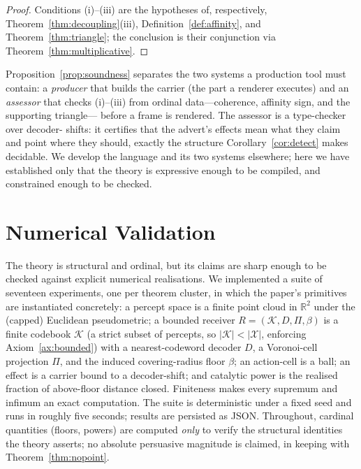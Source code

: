 \documentclass[twocolumn,11pt,a4paper]{article}
\theoremstyle{adv}
\theoremstyle{definition}
\theoremstyle{remark}
\newcommand{\Real}{\mathbb{R}}
\newcommand{\Out}{\mathcal{X}}         %
\newcommand{\Know}{\mathcal{K}}        %
\newcommand{\Dec}{D}                   %
\newcommand{\Proj}{\Pi}                %
\newcommand{\Recv}{R}                  %
\newcommand{\floor}{\beta}            %
\begin{document}
\begin{proof}
Conditions (i)--(iii) are the hypotheses of, respectively,
Theorem~\ref{thm:decoupling}(iii), Definition~\ref{def:affinity}, and
Theorem~\ref{thm:triangle}; the conclusion is their conjunction via
Theorem~\ref{thm:multiplicative}.
\end{proof}

Proposition~\ref{prop:soundness} separates the two systems a production
tool must contain: a \emph{producer} that builds the carrier (the part a
renderer executes) and an \emph{assessor} that checks (i)--(iii) from
ordinal data---coherence, affinity sign, and the supporting triangle---
before a frame is rendered. The assessor is a type-checker over decoder-
shifts: it certifies that the advert's effects mean what they claim and
point where they should, exactly the structure
Corollary~\ref{cor:detect} makes decidable. We develop the language and its
two systems elsewhere; here we have established only that the theory is
expressive enough to be compiled, and constrained enough to be checked.

\section{Numerical Validation}
\label{sec:validation}

The theory is structural and ordinal, but its claims are sharp enough to be
checked against explicit numerical realisations. We implemented a suite of
seventeen experiments, one per theorem cluster, in which the paper's primitives
are instantiated concretely: a percept space is a finite point cloud in
$\Real^2$ under the (capped) Euclidean pseudometric; a bounded receiver
$\Recv=(\Know,\Dec,\Proj,\floor)$ is a finite codebook $\Know$ (a strict
subset of percepts, so $|\Know|<|\Out|$, enforcing
Axiom~\ref{ax:bounded}) with a nearest-codeword decoder $\Dec$, a Voronoi-cell
projection $\Proj$, and the induced covering-radius floor $\floor$; an
action-cell is a ball; an effect is a carrier bound to a decoder-shift; and
catalytic power is the realised fraction of above-floor distance closed.
Finiteness makes every supremum and infimum an exact computation. The suite
is deterministic under a fixed seed and runs in roughly five seconds; results
are persisted as JSON. Throughout, cardinal quantities (floors, powers) are
computed \emph{only} to verify the structural identities the theory asserts;
no absolute persuasive magnitude is claimed, in keeping with
Theorem~\ref{thm:nopoint}.
\end{document}
